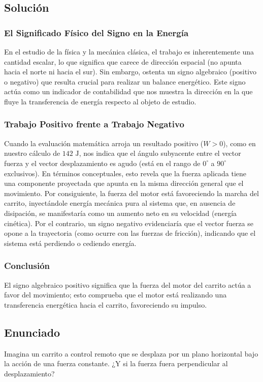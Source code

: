 \documentclass[a4paper,12pt]{article}
\begin{document}
\subsection*{Solución}

\subsubsection*{El Significado Físico del Signo en la Energía}
En el estudio de la física y la mecánica clásica, el trabajo es inherentemente una cantidad escalar, lo que significa que carece de dirección espacial (no apunta hacia el norte ni hacia el sur). Sin embargo, ostenta un signo algebraico (positivo o negativo) que resulta crucial para realizar un balance energético. Este signo actúa como un indicador de contabilidad que nos muestra la dirección en la que fluye la transferencia de energía respecto al objeto de estudio.

\subsubsection*{Trabajo Positivo frente a Trabajo Negativo}
Cuando la evaluación matemática arroja un resultado positivo ($W > 0$), como en nuestro cálculo de $142\text{ J}$, nos indica que el ángulo subyacente entre el vector fuerza y el vector desplazamiento es agudo (está en el rango de $0^\circ$ a $90^\circ$ exclusivos). En términos conceptuales, esto revela que la fuerza aplicada tiene una componente proyectada que apunta en la misma dirección general que el movimiento. Por consiguiente, la fuerza del motor está favoreciendo la marcha del carrito, inyectándole energía mecánica pura al sistema que, en ausencia de disipación, se manifestaría como un aumento neto en su velocidad (energía cinética).
Por el contrario, un signo negativo evidenciaría que el vector fuerza se opone a la trayectoria (como ocurre con las fuerzas de fricción), indicando que el sistema está perdiendo o cediendo energía.

\subsubsection*{Conclusión}
El signo algebraico positivo significa que la fuerza del motor del carrito actúa a favor del movimiento; esto comprueba que el motor está realizando una transferencia energética hacia el carrito, favoreciendo su impulso.

\newpage
\subsection*{Enunciado}
Imagina un carrito a control remoto que se desplaza por un plano horizontal bajo la acción de una fuerza constante.
¿Y si la fuerza fuera perpendicular al desplazamiento?
\end{document}
